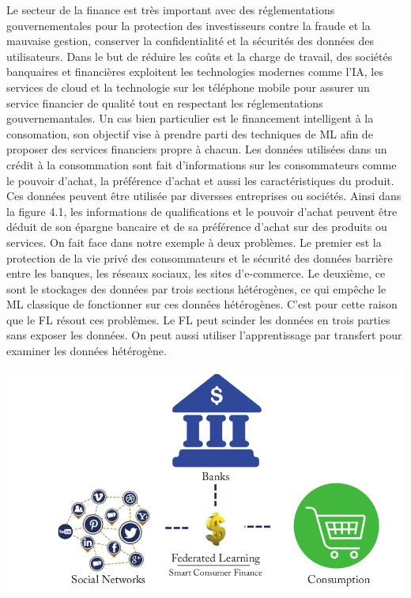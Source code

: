 \documentclass[12pt,a4paper]{report}
\begin{document}
Le secteur de la finance est très important avec des réglementations gouvernementales pour la protection des investisseurs contre la fraude et la mauvaise gestion, conserver la confidentialité et la sécurités des données des utilisateurs. Dans le but de réduire les coûts et la charge de travail, des sociétés banquaires et financières exploitent les technologies modernes comme l'IA, les services de cloud et la technologie sur les téléphone mobile pour assurer un service financier de qualité tout en respectant les réglementations gouvernemantales. Un cas bien particulier est le financement intelligent à la consomation, son objectif vise à prendre parti des techniques de ML afin de proposer des services financiers propre à chacun. Les données utilisées dans un crédit à la consommation sont fait d'informations sur les consommateurs comme le pouvoir d'achat, la préférence d'achat et aussi les caractéristiques du produit. Ces données peuvent être utilisée par diversses entreprises ou sociétés. Ainsi dans la figure 4.1, les informations de qualifications et le pouvoir d'achat peuvent être déduit de son épargne bancaire et de sa préférence d'achat sur des produits ou services. On fait face dans notre exemple à deux problèmes. Le premier est la protection de la vie privé des consommateurs et le sécurité des données barrière entre les banques, les réseaux sociaux, les sites d'e-commerce. Le deuxième, ce sont le stockages des données par trois sections hétérogènes, ce qui empêche le ML classique de fonctionner sur ces données hétérogènes. C'est pour cette raison que le FL résout ces problèmes. Le FL peut scinder les données en trois parties sans exposer les données. On peut aussi utiliser l'apprentissage par transfert pour examiner les données hétérogène.

\begin{center}
	\includegraphics[scale=0.2]{finances}
	\label{fig1}
\end{center}
\end{document}
